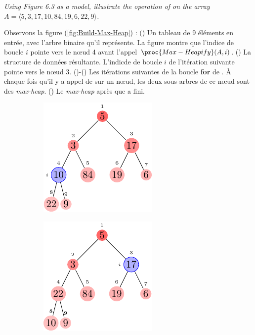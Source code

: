 \begin{description}
     \textit{Using Figure 6.3 as a model, illustrate the operation of  on the
array $A = \langle 5, 3, 17, 10, 84, 19, 6, 22, 9 \rangle$.}
    \begin{ex}
	 Observons la figure (\ref{fig:Build-Max-Heap}) : () Un tableau de 9 \'el\'ements en entr\'ee, avec l'arbre binaire qu'il repr\'esente. La figure montre que l'indice de boucle $i$ pointe vers le n\oe ud 4 avant l'appel $\proc{Max-Heapify}(A,i)$. () La structure de donn\'ees r\'esultante. L'indicde de boucle $i$ de l'it\'eration suivante pointe vers le n\oe ud $3$. ()-() Les it\'erations suivantes de la boucle \textbf{for} de . \`A chaque fois qu'il y a appel de  sur un n\oe ud, les deux sous-arbres de ce n\oe ud sont des \textit{max-heap}. () Le \textit{max-heap} apr\`es que  a fini.
      \begin{figure}[H]
        \centering
        \begin{subfigure}[t]{.45\textwidth}
          \centering
          \includegraphics[scale=1.4]{img/6_3-1/6_3-1_1}
          \caption{}\label{fig:6_3-1_1}
        \end{subfigure}
        \begin{subfigure}[t]{.45\textwidth}
          \centering
          \includegraphics[scale=1.4]{img/6_3-1/6_3-1_2}

\end{subfigure}
\end{figure}
\end{ex}
\end{description}
